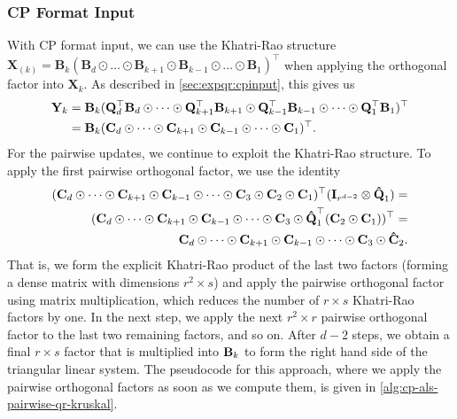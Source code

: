 \documentclass{article}
\newcommand{\mat}[1]{\mathbf{#1}}
\newcommand{\M}[2][]{\bm{#1{\mathbf{\MakeUppercase{#2}}}}} 		%
\begin{document}
\subsubsection{CP Format Input} 
\label{sec:QR-PW-k}

With CP format input, we can use the Khatri-Rao structure $\mat{X}_{(k)} = \mat{B}_{k}(\mat{B}_{d} \odot \dots \odot \mat{B}_{k+1} \odot \mat{B}_{k-1}  \odot \dots \odot \mat{B}_{1})^\top$ when applying the orthogonal factor into $\mat{X}_k$. 
As described in \cref{sec:expqr:cpinput}, this gives us
\begin{align*}
  \mat{Y}_k &= \mat{B}_k(\mat{Q}_d^\top\mat{B}_d \odot \cdots \odot \mat{Q}_{k+1}^\top\mat{B}_{k+1} \odot \mat{Q}_{k-1}^\top\mat{B}_{k-1} \odot \cdots \odot \mat{Q}_1^\top\mat{B}_1)^\top \\
  &= \mat{B}_k(\mat{C}_d \odot \cdots \odot \mat{C}_{k+1} \odot \M{C}_{k-1} \odot \cdots \odot \M{C}_1)^\top.
\end{align*}
For the pairwise updates, we continue to exploit the Khatri-Rao structure.
To apply the first pairwise orthogonal factor, we use the identity
\begin{align*}
(\M{C}_d \odot \cdots \odot \M{C}_{k+1} \odot \M{C}_{k-1} \odot \cdots \odot \M{C}_3 \odot \M{C}_2 \odot \M{C}_1)^\top(\M{I}_{r^{d-2}} \otimes \M[\hat]{Q}_1) = \\
(\M{C}_d \odot \cdots \odot \M{C}_{k+1} \odot \M{C}_{k-1} \odot \cdots \odot \M{C}_3 \odot \M[\hat]{Q}_1^\top(\M{C}_2 \odot \M{C}_1))^\top = \\
\M{C}_d \odot \cdots \odot \M{C}_{k+1} \odot \M{C}_{k-1} \odot \cdots \odot \M{C}_3 \odot \M[\hat]{C}_2.
\end{align*}
That is, we form the explicit Khatri-Rao product of the last two factors (forming a dense matrix with dimensions $r^2 \times s$) and apply the pairwise orthogonal factor using matrix multiplication, which reduces the number of $r \times s$ Khatri-Rao factors by one.
In the next step, we apply the next $r^2 \times r$ pairwise orthogonal factor to the last two remaining factors, and so on.
After $d-2$ steps, we obtain a final $r\times s$ factor that is multiplied into $\M{B}_k$ to form the right hand side of the triangular linear system.
The pseudocode for this approach, where we apply the pairwise orthogonal factors as soon as we compute them, is given in \cref{alg:cp-als-pairwise-qr-kruskal}.
\end{document}
